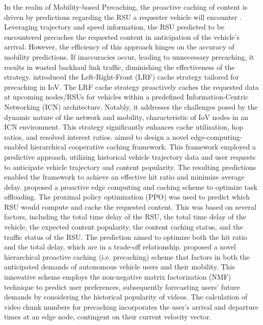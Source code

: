 \documentclass[journal]{IEEEtran}
\begin{document}
In the realm of Mobility-based Precaching, the proactive caching of content is driven by predictions regarding the RSU a requester vehicle will encounter \cite{Ahani2018, AlNagar2019, Liang2018, Ikram2021, Zhe2020, Liu2018, Feng2023, Zhao2023, Khan2024}.
Leveraging trajectory and speed information, the RSU predicted to be encountered precaches the requested content in anticipation of the vehicle's arrival.
However, the efficiency of this approach hinges on the accuracy of mobility predictions.
If inaccuracies occur, leading to unnecessary precaching, it results in wasted backhaul link traffic, diminishing the effectiveness of the strategy.
\cite{Ikram2021} introduced the Left-Right-Front (LRF) cache strategy tailored for precaching in IoV.
The LRF cache strategy proactively caches the requested data at upcoming nodes/RSUs for vehicles within a predefined Information-Centric Networking (ICN) architecture.
Notably, it addresses the challenges posed by the dynamic nature of the network and mobility, characteristic of IoV nodes in an ICN environment.
This strategy significantly enhances cache utilization, hop ratios, and resolved interest ratios.
\cite{Feng2023} aimed to design a novel edge-computing-enabled hierarchical cooperative caching framework. This framework employed a predictive approach, utilizing historical vehicle trajectory data and user requests to anticipate vehicle trajectory and content popularity. The resulting predictions enabled the framework to achieve an effective hit ratio and minimize average delay.
\cite{Zhao2023} proposed a proactive edge computing and caching scheme to optimize task offloading. The proximal policy optimization (PPO) was used to predict which RSU would compute and cache the requested content. This was based on several factors, including the total time delay of the RSU, the total time delay of the vehicle, the expected content popularity, the content caching status, and the traffic status of the RSU. The prediction aimed to optimize both the hit ratio and the total delay, which are in a trade-off relationship.
\cite{Zhe2020} proposed a novel hierarchical proactive caching (i.e. precaching) scheme that factors in both the anticipated demands of autonomous vehicle users and their mobility.
This innovative scheme employs the non-negative matrix factorization (NMF) technique to predict user preferences, subsequently forecasting users' future demands by considering the historical popularity of videos.
The calculation of video chunk numbers for precaching incorporates the user's arrival and departure times at an edge node, contingent on their current velocity vector.
\end{document}
